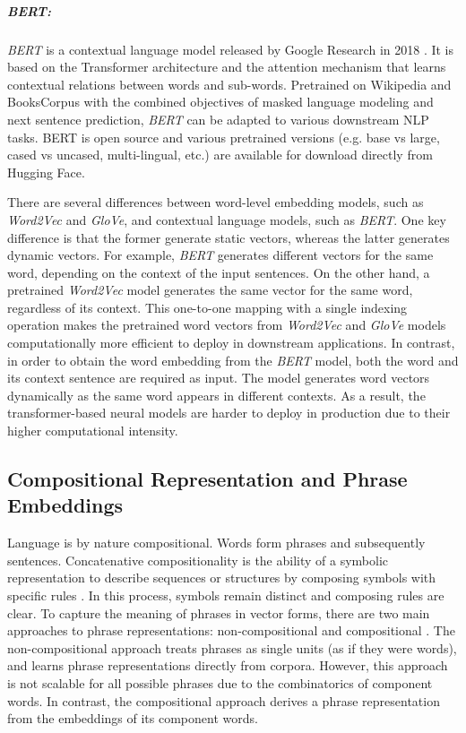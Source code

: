 \subparagraph{\emph{BERT:}} \emph{BERT} is a contextual language model released by Google Research in 2018 \cite{BERT2018}. It is based on the Transformer architecture and the attention mechanism that learns contextual relations between words and sub-words. Pretrained on Wikipedia and BooksCorpus with the combined objectives of masked language modeling and next sentence prediction, \emph{BERT} can be adapted to various downstream NLP tasks. BERT is open source and various pretrained versions (e.g. base vs large, cased vs uncased, multi-lingual, etc.) are available for download directly from Hugging Face. 

There are several differences between word-level embedding models, such as \emph{Word2Vec} and \emph{GloVe}, and contextual language models, such as \emph{BERT}. One key difference is that the former generate static vectors, whereas the latter generates dynamic vectors. For example, \emph{BERT} generates different vectors for the same word, depending on the context of the input sentences. On the other hand, a pretrained \emph{Word2Vec} model generates the same vector for the same word, regardless of its context. This one-to-one mapping with a single indexing operation makes the pretrained word vectors from \emph{Word2Vec} and \emph{GloVe} models computationally more efficient to deploy in downstream applications. In contrast, in order to obtain the word embedding from the \emph{BERT} model, both the word and its context sentence are required as input. The model generates word vectors dynamically as the same word appears in different contexts. As a result, the transformer-based neural models are harder to deploy in production due to their higher computational intensity. 



\subsection{Compositional Representation and Phrase Embeddings}\label{sub:phraseembeddings}

Language is by nature compositional. Words form phrases and subsequently sentences. Concatenative compositionality is the ability of a symbolic representation to describe sequences or structures by composing symbols with specific rules \cite{Ferrone20Survey}. In this process, symbols remain distinct and composing rules are clear. To capture the meaning of phrases in vector forms, there are two main approaches to phrase representations: non-compositional and compositional \cite{NPcomposing19}. The non-compositional approach treats phrases as single units (as if they were words), and learns phrase representations directly from corpora. However, this approach is not scalable for all possible phrases due to the combinatorics of component words. In contrast, the compositional approach derives a phrase representation from the embeddings of its component words. 

